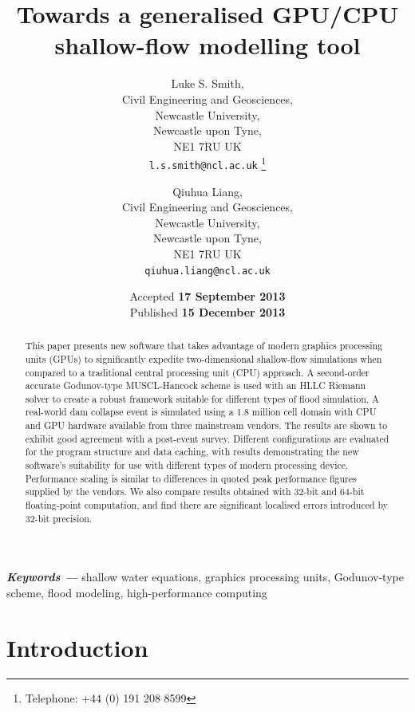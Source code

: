 \documentclass[11pt,english,a4paper]{article}
\title{Towards a generalised GPU/CPU shallow-flow modelling tool}
\author{Luke S. Smith,\\
	Civil Engineering and Geosciences,\\
	Newcastle University,\\
	Newcastle upon Tyne,\\
	NE1 7RU UK\\
	\texttt{l.s.smith@ncl.ac.uk}
	\thanks{Telephone: +44 (0) 191 208 8599}
\and
	Qiuhua Liang,\\
	Civil Engineering and Geosciences,\\
	Newcastle University,\\
	Newcastle upon Tyne,\\
	NE1 7RU UK\\
	\texttt{qiuhua.liang@ncl.ac.uk}
}
\date{\vspace*{12.0pt}Accepted \textbf{17 September 2013} \\ Published \textbf{15 December 2013}}
\providecommand{\keywords}[1]{\textbf{\textit{Keywords ---}} #1}
\begin{document}
\maketitle


\begin{abstract}
This paper presents new software that takes advantage of modern graphics processing units (GPUs) to significantly expedite two-dimensional shallow-flow simulations when compared to a traditional central processing unit (CPU) approach. A second-order accurate Godunov-type MUSCL-Hancock scheme is used with an HLLC Riemann solver to create a robust framework suitable for different types of flood simulation. A real-world dam collapse event is simulated using a 1.8 million cell domain with CPU and GPU hardware available from three mainstream vendors. The results are shown to exhibit good agreement with a post-event survey. Different configurations are evaluated for the program structure and data caching, with results demonstrating the new software's suitability for use with different types of modern processing device. Performance scaling is similar to differences in quoted peak performance figures supplied by the vendors. We also compare results obtained with 32-bit and 64-bit floating-point computation, and find there are significant localised errors introduced by 32-bit precision.
\end{abstract}
\keywords{shallow water equations, graphics processing units, Godunov-type scheme, flood modeling, high-performance computing}

\vfill
\noindent{}

\section{Introduction}
\end{document}
